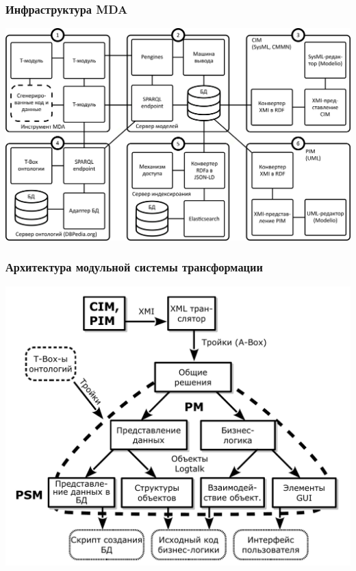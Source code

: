 \documentclass[10pt]{beamer}
\begin{document}


\begin{frame} \frametitle{Инфраструктура MDA} \centering

\includegraphics[width=1\linewidth]{architecture-mda-lod-ext-ru.png} \end{frame} \begin{frame} \frametitle{Архитектура модульной системы трансформации} \centering

\includegraphics[width=0.9\linewidth]{architect_tree_pres-ru-wo-OCL.pdf} \end{frame}
\end{document}
